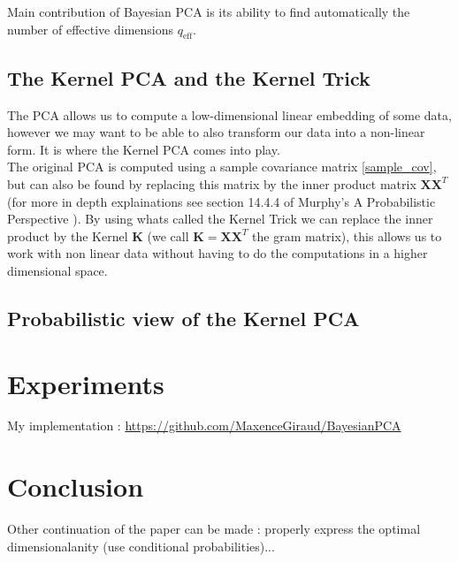 \documentclass{article}
\begin{document}
Main contribution of Bayesian PCA is its ability to find automatically the number of effective dimensions $q_{\text{eff}}$.

\subsection{The Kernel PCA and the Kernel Trick}

The PCA allows us to compute a low-dimensional linear embedding of some data, however we may want to be able to also transform our data into a non-linear form. It is where the Kernel PCA comes into play.\\
The original PCA is computed using a sample covariance matrix \ref{sample_cov}, but can also be found by replacing this matrix by the inner product matrix $\mathbf{X} \mathbf{X}^T$ (for more in depth explainations see section 14.4.4 of Murphy's A Probabilistic Perspective \cite{KevinP.Murphy17}). By using whats called the Kernel Trick we can replace the inner product by the Kernel $\mathbf{K}$ (we call $\mathbf{K} = \mathbf{X}\mathbf{X}^T$ the gram matrix), this allows us to work with non linear data without having to do the computations in a higher dimensional space.

\subsection{Probabilistic view of the Kernel PCA}

\cite{pkpca}

\section{Experiments}
My implementation : \url{https://github.com/MaxenceGiraud/BayesianPCA} 

\section{Conclusion}

Other continuation of the paper can be made : properly express the optimal dimensionalanity (use conditional probabilities)...


\end{document}

